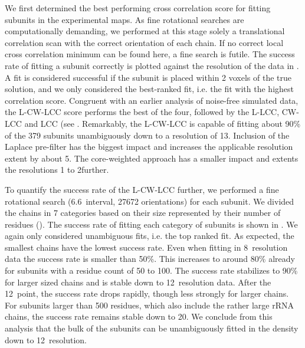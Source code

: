 

We first determined the best performing cross correlation score for fitting
subunits in the experimental maps. As fine rotational searches are
computationally demanding, we performed at this stage solely a translational
correlation scan with the correct orientation of each chain. If no correct
local cross correlation minimum can be found here, a fine search is futile. The
success rate of fitting a subunit correctly is plotted against the resolution
of the data in . A fit is considered successful if
the subunit is placed within 2 voxels of the true solution, and we only
considered the best-ranked fit, i.e. the fit with the highest correlation
score. Congruent with an earlier analysis of noise-free simulated data, the
L-CW-LCC score performs the best of the four, followed by the L-LCC, CW-LCC and
LCC (see .  Remarkably, the L-CW-LCC is capable of
fitting about 90\% of the 379 subunits unambiguously down to a resolution of
13\Angstrom. Inclusion of the Laplace pre-filter has the biggest impact and
increases the applicable resolution extent by about 5\Angstrom. The
core-weighted approach has a smaller impact and extents the resolutions 1 to
2\Angstrom further. 

{}



To quantify the success rate of the L-CW-LCC further, we performed a fine
rotational search (6.6\Deg\ interval, 27672 orientations) for each subunit.  We
divided the chains in 7 categories based on their size represented by their
number of residues (). The success rate of fitting
each category of subunits is shown in . We again
only considered unambiguous fits, i.e.  the top ranked fit. As expected, the
smallest chains have the lowest success rate. Even when fitting in 8\Angstrom\
resolution data the success rate is smaller than 50\%. This increases to around
80\% already for subunits with a residue count of 50 to 100. The success rate
stabilizes to 90\% for larger sized chains and is stable down to 12\Angstrom\
resolution data. After the 12\Angstrom\ point, the success rate drops rapidly,
though less strongly for larger chains. For subunits larger than 500 residues,
which also include the rather large rRNA chains, the success rate remains
stable down to 20\Angstrom.  We conclude from this analysis that the bulk of
the subunits can be unambiguously fitted in the density down to 12\Angstrom\
resolution. 

